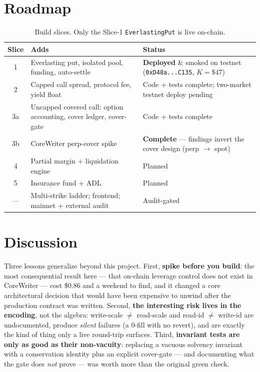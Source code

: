 \documentclass[11pt]{article}
\newcommand{\code}[1]{\texttt{\small #1}}
\begin{document}
\section{Roadmap}

\begin{table}[h]
\centering
\renewcommand{\arraystretch}{1.2}
\begin{tabular}{@{}clp{6.3cm}@{}}
\toprule
\textbf{Slice} & \textbf{Adds} & \textbf{Status} \\
\midrule
1  & Everlasting put, isolated pool, funding, auto-settle & \textbf{Deployed} \& smoked on testnet (\code{0xD48a...C135}, $K=\$47$) \\
2  & Capped call spread, protocol fee, yield float & Code + tests complete; two-market testnet deploy pending \\
3a & Uncapped covered call: option accounting, cover ledger, cover-gate & Code + tests complete \\
3b & CoreWriter perp-cover spike & \textbf{Complete} --- findings invert the cover design (perp $\to$ spot) \\
4  & Partial margin + liquidation engine & Planned \\
5  & Insurance fund + ADL & Planned \\
--- & Multi-strike ladder; frontend; mainnet + external audit & Audit-gated \\
\bottomrule
\end{tabular}
\caption{Build slices. Only the Slice-1 \code{EverlastingPut} is live on-chain.}
\label{tab:roadmap}
\end{table}

\section{Discussion}

Three lessons generalize beyond this project. First, \textbf{spike before you build}: the most
consequential result here --- that on-chain leverage control does not exist in CoreWriter --- cost
\$0.86 and a weekend to find, and it changed a core architectural decision that would have been
expensive to unwind after the production contract was written. Second, \textbf{the interesting risk
lives in the encoding}, not the algebra: write-scale $\neq$ read-scale and read-id $\neq$ write-id are
undocumented, produce \emph{silent} failures (a 0-fill with no revert), and are exactly the kind of
thing only a live round-trip surfaces. Third, \textbf{invariant tests are only as good as their
non-vacuity}: replacing a vacuous solvency invariant with a conservation identity plus an explicit
cover-gate --- and documenting what the gate does \emph{not} prove --- was worth more than the
original green check.
\end{document}
